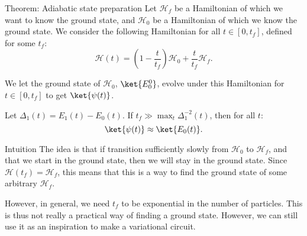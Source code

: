 \documentclass[a4paper]{article}
\begin{document}
\begin{parag}{Theorem: Adiabatic state preparation}
    Let $\mathcal{H}_f$ be a Hamiltonian of which we want to know the ground state, and $\mathcal{H}_0$ be a Hamiltonian of which we know the ground state. We consider the following Hamiltonian for all $t \in \left[0, t_f\right]$, defined for some $t_f$:
    \[\mathcal{H}\left(t\right) = \left(1 - \frac{t}{t_f}\right) \mathcal{H}_0 + \frac{t}{t_f} \mathcal{H}_f.\]

    We let the ground state of $\mathcal{H}_0$, $\ket{E_0^0}$, evolve under this Hamiltonian for $t \in \left[0, t_f\right]$ to get $\ket{\psi\left(t\right)}$.

    Let $\Delta_1\left(t\right) = E_1\left(t\right) - E_0\left(t\right)$. If $t_f \gg \max_t \Delta_1^{-2}\left(t\right)$, then for all $t$: 
    \[\ket{\psi\left(t\right)} \approx \ket{E_0\left(t\right)}.\]
    
    \begin{subparag}{Intuition}
        The idea is that if transition sufficiently slowly from $\mathcal{H}_0$ to $\mathcal{H}_f$, and that we start in the ground state, then we will stay in the ground state. Since $\mathcal{H}\left(t_f\right) = \mathcal{H}_f$, this means that this is a way to find the ground state of some arbitrary $\mathcal{H}_f$.
        
        However, in general, we need $t_f$ to be exponential in the number of particles. This is thus not really a practical way of finding a ground state. However, we can still use it as an inspiration to make a variational circuit.
    \end{subparag}
\end{parag}
\end{document}
